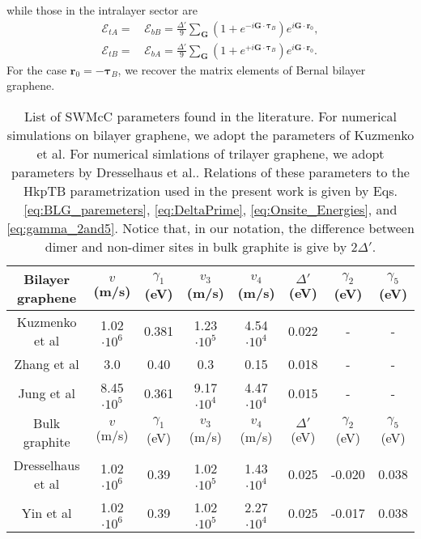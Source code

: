 \documentclass[showpacs,aps,prb,reprint,twocolumn]{revtex4-1}
\begin{document}
while those in the intralayer sector are
\begin{align}\label{eq:Delta_r0}
\mathcal{E}_{tA}=&\,\mathcal{E}_{bB}=
\frac{\Delta'}{9}
\sum_{\boldsymbol{G}}
\left(
1+e^{-i\boldsymbol{G}\cdot\boldsymbol{\tau}_B}
\right)
e^{i\boldsymbol{G}\cdot\boldsymbol{r}_0},\\
\mathcal{E}_{tB}=&\,\mathcal{E}_{bA}=
\frac{\Delta'}{9}
\sum_{\boldsymbol{G}}
\left(
1+e^{+i\boldsymbol{G}\cdot\boldsymbol{\tau}_B}
\right)
e^{i\boldsymbol{G}\cdot\boldsymbol{r}_0}.\nonumber
\end{align}
For the case $\boldsymbol{r}_0=-\boldsymbol{\tau}_B$, we recover the matrix elements of Bernal bilayer graphene. 



\begin{table*}
\begin{center}
 \begin{tabular}{||c | c | c | c | c| c | c | c ||}
 \hline
 Bilayer graphene & $v$ (m/s) & $\gamma_1$ (eV) & $v_3$ (m/s) & $v_4$ (m/s) &$\Delta'$ (eV)&$\gamma_2$ (eV)&$\gamma_5$ (eV)\\ [0.5ex] 
 \hline
 \hline
 Kuzmenko et al \cite{Kuzmenko_2009} & 1.02$\cdot10^6$ & 0.381 & 1.23$\cdot10^5$ & 4.54$\cdot10^4$ &0.022&-&-\\
 \hline
 Zhang et al \cite{Zhang_2008} & 3.0 & 0.40 & 0.3 & 0.15 &0.018&-&-\\
 \hline
 Jung et al \cite{Jeil_2014} & 8.45$\cdot10^5$ & 0.361 & 9.17$\cdot10^4$ & 4.47$\cdot10^4$ &0.015&-&-\\
 \hline
 \hline
 Bulk graphite & $v$ (m/s) & $\gamma_1$ (eV) & $v_3$ (m/s) & $v_4$ (m/s) &$\Delta'$ (eV)&$\gamma_2$ (eV)&$\gamma_5$ (eV)\\ [0.5ex] 
 \hline
 \hline
Dresselhaus et al \cite{Dresselhaus_2002} & 1.02$\cdot10^6$ & 0.39 & 1.02$\cdot10^5$ & 1.43$\cdot10^4$ &0.025&-0.020&0.038\\
 \hline
Yin et al \cite{Yin_2019} & 1.02$\cdot10^6$ & 0.39 & 1.02$\cdot10^5$ & 2.27$\cdot10^4$ &0.025&-0.017&0.038\\
 \hline
\end{tabular}
\end{center}
\caption{List of SWMcC parameters found in the literature. For numerical simulations on bilayer graphene, we adopt the parameters of Kuzmenko et al\cite{Kuzmenko_2009}. For numerical simlations of trilayer graphene, we adopt parameters by Dresselhaus et al.\cite{Dresselhaus_2002}. Relations of these parameters to the HkpTB parametrization used in the present work is given by Eqs. \ref{eq:BLG_paremeters}, \ref{eq:DeltaPrime}, \ref{eq:Onsite_Energies}, and \ref{eq:gamma_2and5}. Notice that, in our notation, the difference between dimer and non-dimer sites in bulk graphite is give by $2\Delta'$.  \label{table:SWMcC_parameters}}
\end{table*}
\end{document}
